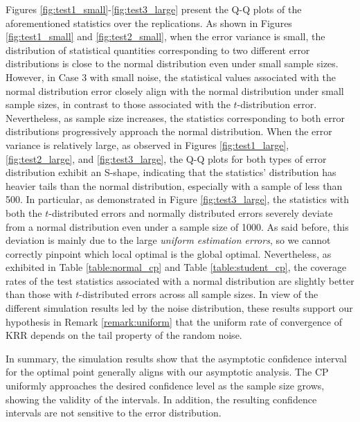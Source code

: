 \documentclass[12pt]{article}
\theoremstyle{plain}
\theoremstyle{remark}
\begin{document}
Figures \ref{fig:test1_small}-\ref{fig:test3_large} %
present the Q-Q plots of the aforementioned statistics over the replications. As shown in Figures \ref{fig:test1_small} and \ref{fig:test2_small}, when the error variance is small, the distribution of statistical quantities corresponding to two different error distributions is close to the normal distribution even under small sample sizes. However, in Case 3 with small noise, the statistical values associated with the normal distribution error closely align with the normal distribution under small sample sizes, in contrast to those associated with the $t$-distribution error. Nevertheless, as sample size increases, the statistics corresponding to both error distributions progressively approach the normal distribution. When the error variance is relatively large, as observed in Figures \ref{fig:test1_large}, \ref{fig:test2_large}, and \ref{fig:test3_large}, the Q-Q plots for both types of error distribution exhibit an S-shape, indicating that the statistics' distribution has heavier tails than the normal distribution, especially with a sample of less than 500. In particular, as demonstrated in Figure \ref{fig:test3_large},  the statistics with both the $t$-distributed errors and normally distributed errors severely  deviate from a normal distribution even under a sample size of 1000. As said before, this deviation is mainly due to the large \textit{uniform estimation errors}, so we cannot correctly pinpoint which local optimal is the global optimal. Nevertheless, as exhibited in Table \ref{table:normal_cp} and Table \ref{table:student_cp}, the coverage rates of the test statistics associated with a normal distribution are slightly better than those with $t$-distributed errors across all sample sizes.
In view of the different simulation results led by the noise distribution, these results support our hypothesis in Remark \ref{remark:uniform} that the uniform rate of convergence of KRR depends on the tail property of the random noise.

In summary, the simulation results show that the asymptotic confidence interval for the optimal point generally aligns with our asymptotic analysis. The CP uniformly approaches the desired confidence level as the sample size grows, showing the validity of the intervals. In addition, the resulting confidence intervals are not sensitive to the error distribution.
\end{document}
